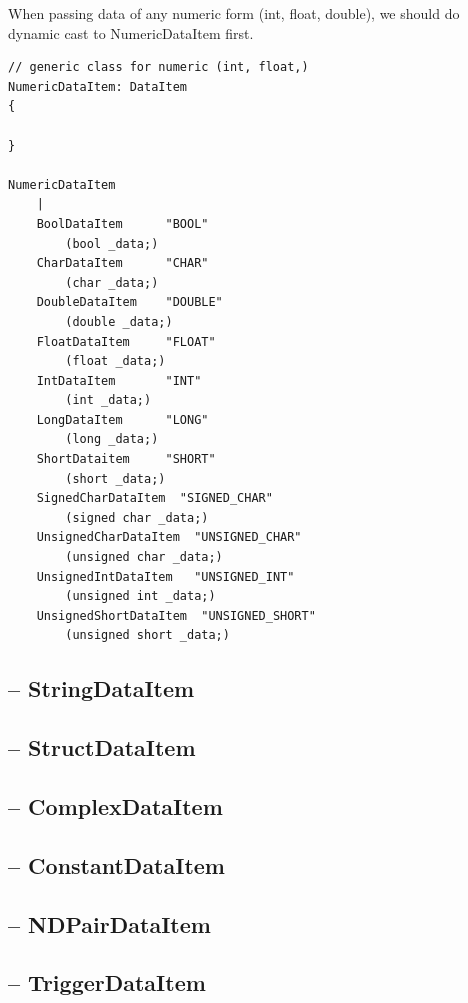 When passing data of any numeric form (int, float, double), we should do dynamic
cast to NumericDataItem first.


\begin{verbatim}
// generic class for numeric (int, float,)
NumericDataItem: DataItem
{

}

NumericDataItem
    |
    BoolDataItem      "BOOL" 
        (bool _data;)
    CharDataItem      "CHAR"
        (char _data;)
    DoubleDataItem    "DOUBLE"
        (double _data;)
    FloatDataItem     "FLOAT"
        (float _data;)
    IntDataItem       "INT"
        (int _data;)
    LongDataItem      "LONG"
        (long _data;)
    ShortDataitem     "SHORT"
        (short _data;)
    SignedCharDataItem  "SIGNED_CHAR"
        (signed char _data;)
    UnsignedCharDataItem  "UNSIGNED_CHAR"
        (unsigned char _data;)
    UnsignedIntDataItem   "UNSIGNED_INT"
        (unsigned int _data;)
    UnsignedShortDataItem  "UNSIGNED_SHORT"
        (unsigned short _data;)

\end{verbatim}

\subsection{-- StringDataItem}
\label{sec:StringDataItem}

\subsection{-- StructDataItem}
\label{sec:StructDataItem}

\subsection{-- ComplexDataItem}
\label{sec:ComplexDataItem}

\subsection{-- ConstantDataItem}
\label{sec:ConstantDataItem}

\subsection{-- NDPairDataItem}
\label{sec:NDPairDataItem}

\subsection{-- TriggerDataItem}
\label{sec:TriggerDataItem}

